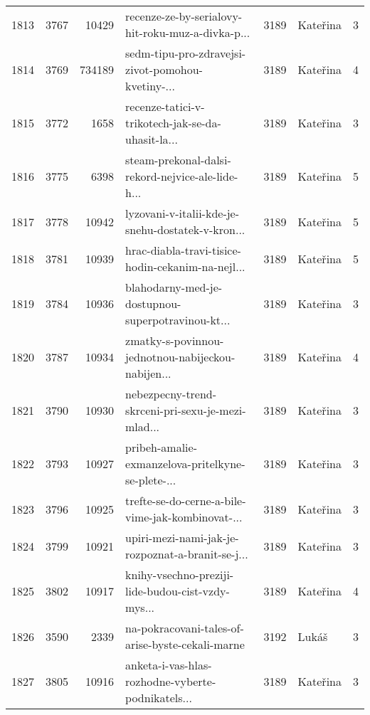 \begin{tabular}{lrrlrlr}
1813 &       3767 &    10429 &  recenze-ze-by-serialovy-hit-roku-muz-a-divka-p... &     3189 &                     Kateřina &               3 \\
1814 &       3769 &   734189 &  sedm-tipu-pro-zdravejsi-zivot-pomohou-kvetiny-... &     3189 &                     Kateřina &               4 \\
1815 &       3772 &     1658 &  recenze-tatici-v-trikotech-jak-se-da-uhasit-la... &     3189 &                     Kateřina &               3 \\
1816 &       3775 &     6398 &  steam-prekonal-dalsi-rekord-nejvice-ale-lide-h... &     3189 &                     Kateřina &               5 \\
1817 &       3778 &    10942 &  lyzovani-v-italii-kde-je-snehu-dostatek-v-kron... &     3189 &                     Kateřina &               5 \\
1818 &       3781 &    10939 &  hrac-diabla-travi-tisice-hodin-cekanim-na-nejl... &     3189 &                     Kateřina &               5 \\
1819 &       3784 &    10936 &  blahodarny-med-je-dostupnou-superpotravinou-kt... &     3189 &                     Kateřina &               3 \\
1820 &       3787 &    10934 &  zmatky-s-povinnou-jednotnou-nabijeckou-nabijen... &     3189 &                     Kateřina &               4 \\
1821 &       3790 &    10930 &  nebezpecny-trend-skrceni-pri-sexu-je-mezi-mlad... &     3189 &                     Kateřina &               3 \\
1822 &       3793 &    10927 &  pribeh-amalie-exmanzelova-pritelkyne-se-plete-... &     3189 &                     Kateřina &               3 \\
1823 &       3796 &    10925 &  trefte-se-do-cerne-a-bile-vime-jak-kombinovat-... &     3189 &                     Kateřina &               3 \\
1824 &       3799 &    10921 &  upiri-mezi-nami-jak-je-rozpoznat-a-branit-se-j... &     3189 &                     Kateřina &               3 \\
1825 &       3802 &    10917 &  knihy-vsechno-preziji-lide-budou-cist-vzdy-mys... &     3189 &                     Kateřina &               4 \\
1826 &       3590 &     2339 &   na-pokracovani-tales-of-arise-byste-cekali-marne &     3192 &                        Lukáš &               3 \\
1827 &       3805 &    10916 &  anketa-i-vas-hlas-rozhodne-vyberte-podnikatels... &     3189 &                     Kateřina &               3 \\

\end{tabular}
